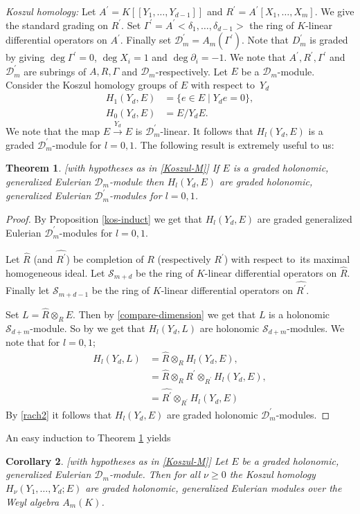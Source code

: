 \documentclass{amsart}
\newcommand{\wrt}{with respect to}
\newcommand{\D}{\mathcal{D} }
\newcommand{\Sc}{\mathcal{S} }
\theoremstyle{plain}
\newtheorem{theorem}{Theorem}[section]
\newtheorem{corollary}[theorem]{Corollary}
\theoremstyle{definition}
\theoremstyle{remark}
\begin{document}
\s\label{Koszul-M} \emph{Koszul homology:} Let $A^\prime = K[[Y_1,\ldots, Y_{d-1}]]$ and  $R^\prime = A^\prime[X_1,\ldots, X_m]$.
We give the standard grading on $R^\prime$.
Set $\Gamma^\prime = A^\prime<\delta_1,\ldots, \delta_{d-1}>$ the ring of $K$-linear differential operators on $A^\prime$.
Finally set $\D_m^\prime = A_m(\Gamma^\prime)$. Note that $D_m^\prime$ is graded by giving $\deg \Gamma^\prime = 0$, 
$\deg X_i = 1$ and $\deg \partial_i = -1$.
We note that $A^\prime, R^\prime, \Gamma^\prime$ and $\D_m^\prime$ are subrings
of $A, R, \Gamma$ and $\D_m$-respectively. Let $E$ be a $\D_m$-module. Consider the Koszul homology groups of $E$ \wrt \ $Y_d$ 
\begin{align*}
 H_1(Y_d, E) &= \{ e \in E \mid Y_d e = 0 \}, \\
 H_0(Y_d, E) &= E/Y_d E.
\end{align*}
We note that the map $E \xrightarrow{Y_d} E$ is $\D_m^\prime$-linear. It follows that $H_l(Y_d, E)$ is a graded $\D_m^\prime$-module
for $l = 0, 1$. The following result is extremely useful to us:
\begin{theorem}\label{Koszul-local}[with hypotheses as in \ref{Koszul-M}]
 If $E$ is a graded holonomic, generalized Eulerian  $\D_m$-module then  $H_l(Y_d, E)$ are graded holonomic, generalized Eulerian $\D_m^\prime$-modules
for $l = 0, 1$. 
\end{theorem}
\begin{proof}
By Proposition \ref{kos-induct} we get that $H_l(Y_d, E)$ are graded generalized Eulerian $\D_m^\prime$-modules
for $l = 0, 1$. 

 Let $\widehat{R}$ (and $\widehat{R^\prime}$) be completion of $R$ (respectively $R^\prime$)
 \wrt \ its maximal homogeneous ideal. Let $\Sc_{m+d}$ be the ring of $K$-linear differential operators on $\widehat{R}$.
 Finally let $\Sc_{m+d-1}$ be the ring of $K$-linear differential operators on $\widehat{R^\prime}$.
 
 Set $L = \widehat{R}\otimes_R E$. Then by \ref{compare-dimension} we get that $L$ is a holonomic $\Sc_{d + m}$-module.
 So by \cite[3.4.2 and 3.4.4]{Bjork} we get that $H_l(Y_d, L)$ are holonomic $\Sc_{d + m}$-modules.
 We note that for $l = 0, 1$;
 \begin{align*}
  H_l(Y_d, L) &= \widehat{R}\otimes_R H_l(Y_d, E), \\
  &= \widehat{R}\otimes_R R^\prime \otimes_{R^\prime} H_l(Y_d, E), \\
  &= \widehat{R^\prime} \otimes_{R^\prime} H_l(Y_d, E)
 \end{align*}
By \ref{rach2} it follows that $H_l(Y_d, E)$ are graded holonomic $\D_m^\prime$-modules.
\end{proof}
An easy induction to Theorem \ref{Koszul-local} yields
\begin{corollary}\label{full-koszul-hom}[with hypotheses as in \ref{Koszul-M}]
 Let $E$ be a graded holonomic, \\ generalized Eulerian $\D_m$-module. Then for all $\nu \geq 0$ the Koszul homology \\
 $H_\nu(Y_1,\ldots, Y_d; E)$ are graded holonomic, generalized Eulerian  modules over the Weyl algebra $A_m(K)$.
\end{corollary}
\end{document}
